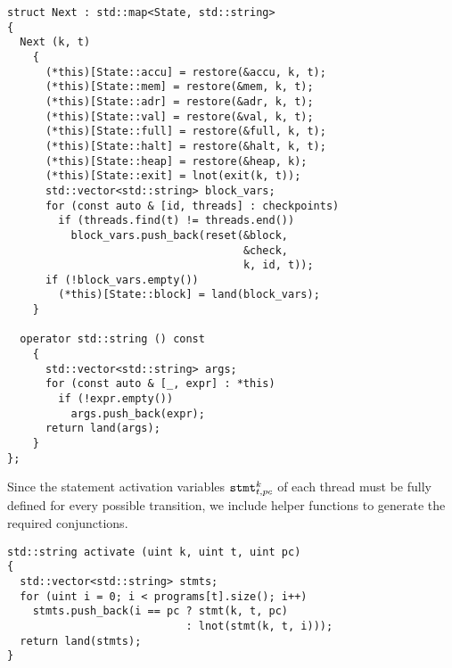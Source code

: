 \begin{lstlisting}[style=c++]
struct Next : std::map<State, std::string>
{
  Next (k, t)
    {
      (*this)[State::accu] = restore(&accu, k, t);
      (*this)[State::mem] = restore(&mem, k, t);
      (*this)[State::adr] = restore(&adr, k, t);
      (*this)[State::val] = restore(&val, k, t);
      (*this)[State::full] = restore(&full, k, t);
      (*this)[State::halt] = restore(&halt, k, t);
      (*this)[State::heap] = restore(&heap, k);
      (*this)[State::exit] = lnot(exit(k, t));
      std::vector<std::string> block_vars;
      for (const auto & [id, threads] : checkpoints)
        if (threads.find(t) != threads.end())
          block_vars.push_back(reset(&block,
                                     &check,
                                     k, id, t));
      if (!block_vars.empty())
        (*this)[State::block] = land(block_vars);
    }

  operator std::string () const
    {
      std::vector<std::string> args;
      for (const auto & [_, expr] : *this)
        if (!expr.empty())
          args.push_back(expr);
      return land(args);
    }
};
\end{lstlisting}


\newpage
\noindent
Since the statement activation variables $\texttt{stmt}^k_{t, pc}$ of each thread must be fully defined for every possible transition, we include helper functions to generate the required conjunctions.

\begin{lstlisting}[style=c++]
std::string activate (uint k, uint t, uint pc)
{
  std::vector<std::string> stmts;
  for (uint i = 0; i < programs[t].size(); i++)
    stmts.push_back(i == pc ? stmt(k, t, pc)
                            : lnot(stmt(k, t, i)));
  return land(stmts);
}
\end{lstlisting}

